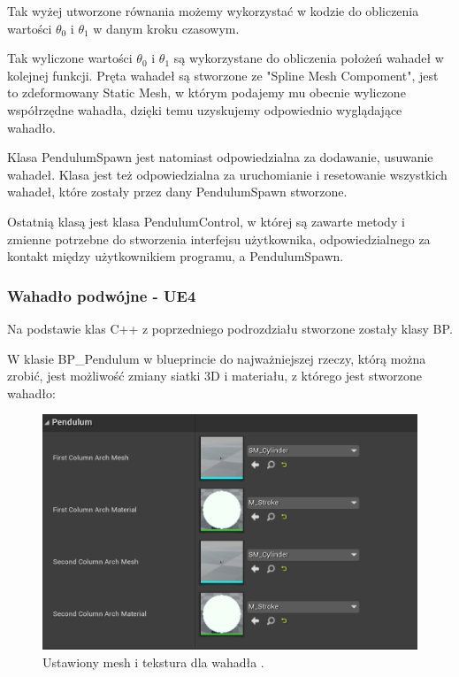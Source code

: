 \documentclass[a4paper,12pt,reqno]{article}
\begin{document}
Tak wyżej utworzone równania możemy wykorzystać w kodzie do obliczenia wartości $\theta_0$ i $\theta_1$ w danym kroku czasowym.


\label{ComputeTheta}


Tak wyliczone wartości $\theta_0$ i $\theta_1$ są wykorzystane do obliczenia położeń wahadeł w kolejnej funkcji. Pręta wahadeł są stworzone ze "Spline Mesh Compoment", jest to zdeformowany Static Mesh, w którym podajemy mu obecnie wyliczone współrzędne wahadła, dzięki temu uzyskujemy odpowiednio wyglądające wahadło.




Klasa PendulumSpawn jest natomiast odpowiedzialna za dodawanie, usuwanie wahadeł. Klasa jest też odpowiedzialna za uruchomianie i resetowanie wszystkich wahadeł, które zostały przez dany PendulumSpawn stworzone.

Ostatnią klasą jest klasa PendulumControl, w której są zawarte metody i zmienne potrzebne do stworzenia interfejsu użytkownika, odpowiedzialnego za kontakt między użytkownikiem programu, a PendulumSpawn.

\subsubsection{Wahadło podwójne - UE4}

Na podstawie klas C++ z poprzedniego podrozdziału stworzone zostały klasy BP.


W klasie BP\_Pendulum w blueprincie do najważniejszej rzeczy, którą można zrobić, jest możliwość zmiany siatki 3D i materiału, z którego jest stworzone wahadło:

\begin{figure}[!ht]%
\centering
\includegraphics[width=0.7\columnwidth]{graphics/pendulum/PendulumBP.png}
\caption{Ustawiony mesh i tekstura dla wahadła .
\label{BPExample}}%
%
\qquad
\end{figure}  
\end{document}

